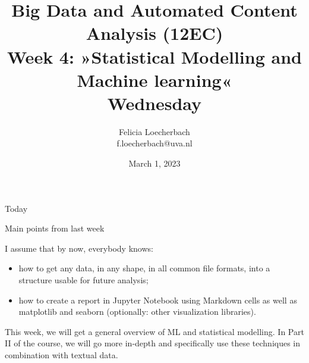 

\graphicspath{{../../resources/img/}}




\title[Big Data and Automated Content Analysis]{\textbf{Big Data and Automated Content Analysis (12EC)} 
\\Week 4: »Statistical Modelling and Machine learning«
\\Wednesday}
\author[Felicia Loecherbach]{Felicia Loecherbach\\ \footnotesize{f.loecherbach@uva.nl\\}}
\date{March 1, 2023}


\begin{frame}{}
	\titlepage
\end{frame}

\begin{frame}{Today}
	\tableofcontents
\end{frame}





\begin{frame}{Main points from last week}

\begin{alertblock}{I assume that by now, everybody knows:}
\begin{itemize}
\item how to get any data, in any shape, in all common file formats, into a structure usable for future analysis;
\item how to create a report in Jupyter Notebook using Markdown cells as well as matplotlib and seaborn (optionally: other visualization libraries).
\end{itemize}
\end{alertblock}
\end{frame}


\begin{frame}[standout]
This week, we will get a general overview of ML and statistical modelling. In Part II of the course, we will go more in-depth and specifically use these techniques in combination with textual data.
\end{frame}














